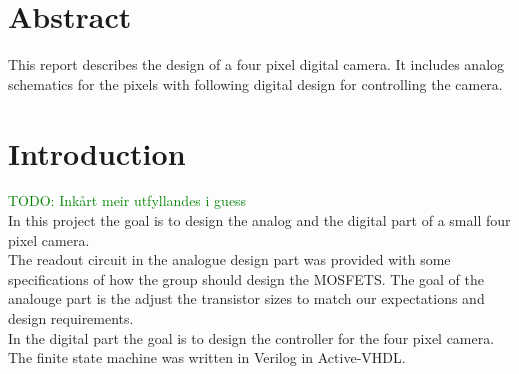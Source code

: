 \section{Abstract}
This report describes the design of a four pixel digital camera. It includes analog schematics for the pixels with following digital design for controlling the camera.


\section{Introduction}
\textcolor{green}{TODO: Inkårt meir utfyllandes i guess} \\
In this project the goal is to design the analog and the digital part of a small four pixel camera. \\

The readout circuit in the analogue design part was provided with some specifications of how the group should design the MOSFETS. The goal of the analouge part is the adjust the transistor sizes to match our expectations and design requirements. \\

In the digital part the goal is to design the controller for the four pixel camera. The finite state machine was written in Verilog in Active-VHDL.




\newpage